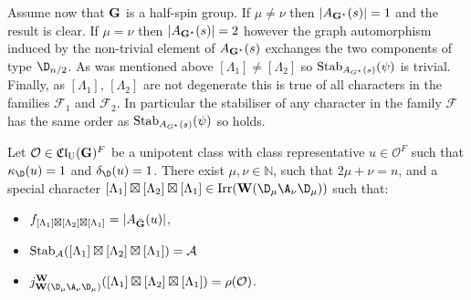 \documentclass[eqthmnum]{jt-calcs}
\newcommand{\Clu}{\ensuremath{\mathfrak{Cl}_{\mathrm{U}}}}
\renewcommand{\cref}{\Cref}
\begin{document}
\begin{pa}
Assume now that $\mathbf{G}$ is a half-spin group. If $\mu\neq\nu$ then $|A_{\mathbf{G}^{\star}}(s)|=1$ and the result is clear. If $\mu=\nu$ then $|A_{\mathbf{G}^{\star}}(s)|=2$ however the graph automorphism induced by the non-trivial element of $A_{\mathbf{G}^{\star}}(s)$ exchanges the two components of type $\D_{n/2}$. As was mentioned above $[\Lambda_1]\neq[\Lambda_2]$ so $\operatorname{Stab}_{A_{G^{\star}}(s)}(\psi)$ is trivial. Finally, as $[\Lambda_1]$, $[\Lambda_2]$ are not degenerate this is true of all characters in the families $\mathcal{F}_1$ and $\mathcal{F}_2$. In particular the stabiliser of any character in the family $\mathcal{F}$ has the same order as $\operatorname{Stab}_{A_{G^{\star}}(s)}(\psi)$ so \cref{P5} holds.
\end{pa}

\begin{prop}\label{prop:lusztig-typeD-2}
Let $\mathcal{O} \in \Clu(\bG)^F$ be a unipotent class with class representative $u \in \mathcal{O}^F$ such that $\kappa_{\D}(u) = 1$ and $\delta_{\D}(u) = 1$. There exist $\mu, \nu \in \mathbb{N}$, such that $2\mu + \nu = n$, and a special character $[\Lambda_1]\boxtimes[\Lambda_2]\boxtimes[\Lambda_1] \in \Irr(\bW(\D_{\mu}\A_{\nu}\D_{\mu}))$ such that:
\begin{itemize}
	\item $f_{[\Lambda_1]\boxtimes[\Lambda_2] \boxtimes [\Lambda_1]} = |A_{\tilde{\mathbf{G}}}(u)|$,
	\item $\operatorname{Stab}_{\mathcal{A}}([\Lambda_1]\boxtimes [\Lambda_2] \boxtimes [\Lambda_1]) = \mathcal{A}$
	\item $j_{\bW(\D_{\mu}\A_{\nu}\D_{\mu})}^{\bW}([\Lambda_1] \boxtimes [\Lambda_2] \boxtimes [\Lambda_1]) = \rho(\mathcal{O})$.
\end{itemize}
\end{prop}
\end{document}
